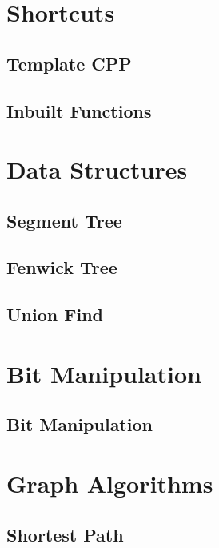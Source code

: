\section{Shortcuts}
\subsection{Template CPP}
\raggedbottom
\hrulefill
\subsection{Inbuilt Functions}
\raggedbottom
\hrulefill

\section{Data Structures}
\subsection{Segment Tree}
\raggedbottom
\hrulefill
\subsection{Fenwick Tree}
\raggedbottom
\hrulefill
\subsection{Union Find}
\raggedbottom
\hrulefill

\section{Bit Manipulation}
\subsection{Bit Manipulation}
\raggedbottom
\hrulefill

\section{Graph Algorithms}
\subsection{Shortest Path}
\raggedbottom
\hrulefill
